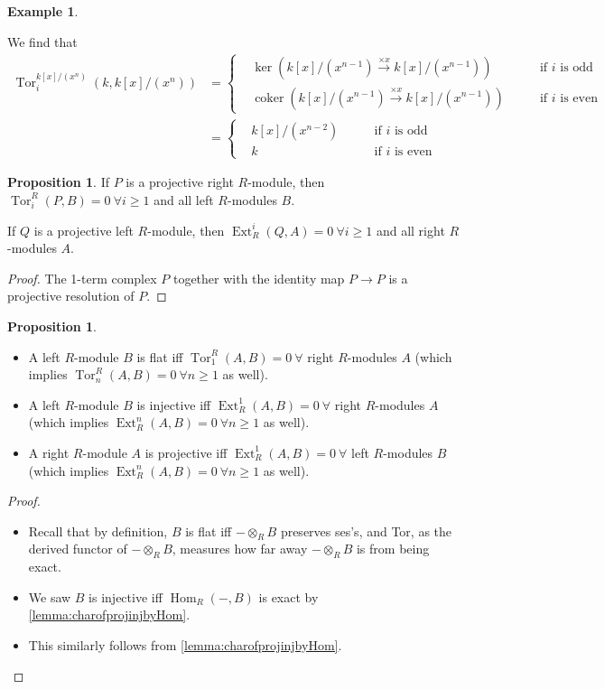 \documentclass{article}
\newcommand{\Hom}{\operatorname{Hom}}
\newcommand{\coker}{\operatorname{coker}}
\newcommand{\Tor}{\operatorname{Tor}}
\newcommand{\Ext}{\operatorname{Ext}}
\theoremstyle{definition}
\newtheorem{prop}[defn]{Proposition}
\newtheorem{example}[defn]{Example}
\begin{document}
\begin{example}
\begin{enumerate}
\[\]
We find that
\[
\begin{aligned}
\Tor_i^{k[x]/(x^n)}\left(k,k[x]/(x^n)\right)&=\left\{
\begin{aligned}
&\ker\left(k[x]/(x^{n-1})\xrightarrow{\times x}k[x]/(x^{n-1})\right) \qquad&\text{if }i\text{ is odd}\\
&\coker\left(k[x]/(x^{n-1})\xrightarrow{\times x}k[x]/(x^{n-1})\right) \qquad&\text{if }i\text{ is even}
\end{aligned}
\right. \\
&=\left\{
\begin{aligned}
&k[x]/(x^{n-2})\qquad&\text{if }i\text{ is odd} \\
&k\qquad&\text{if }i\text{ is even}
\end{aligned}
\right.
\end{aligned}
\]
\end{enumerate}
\end{example}

\begin{prop}
\label{prop:projTorExt0}
If $P$ is a projective right $R$-module, then $\Tor_i^R(P,B)=0 \ \forall i\geq 1$ and all left $R$-modules $B$.

If $Q$ is a projective left $R$-module, then $\Ext_R^i(Q,A)=0 \ \forall i\geq 1$ and all right $R$-modules $A$.
\end{prop}
\begin{proof}
The 1-term complex $P$ together with the identity map $P\rightarrow P$ is a projective resolution of $P$.
\end{proof}

\begin{prop}
\label{prop:flatinjprojExtTor0}
\begin{itemize}
\item A left $R$-module $B$ is flat iff $\Tor_1^R(A,B)=0 \ \forall$ right $R$-modules $A$ (which implies $\Tor_n^R(A,B)=0 \ \forall n\geq 1$ as well).
\item A left $R$-module $B$ is injective iff $\Ext_R^1(A,B)=0 \ \forall$ right $R$-modules $A$ (which implies $\Ext_R^n(A,B)=0 \ \forall n\geq 1$ as well).
\item A right $R$-module $A$ is projective iff $\Ext_R^1(A,B)=0 \ \forall$ left $R$-modules $B$ (which implies $\Ext_R^n(A,B)=0 \ \forall n\geq 1$ as well).
\end{itemize}
\end{prop}
\begin{proof}
\begin{itemize}
\item Recall that by definition, $B$ is flat iff $-\otimes_RB$ preserves ses's, and Tor, as the derived functor of $-\otimes_RB$, measures how far away $-\otimes_RB$ is from being exact.
\item We saw $B$ is injective iff $\Hom_R(-,B)$ is exact by \ref{lemma:charofprojinjbyHom}.
\item This similarly follows from \ref{lemma:charofprojinjbyHom}.
\end{itemize}
\end{proof}
\end{document}
